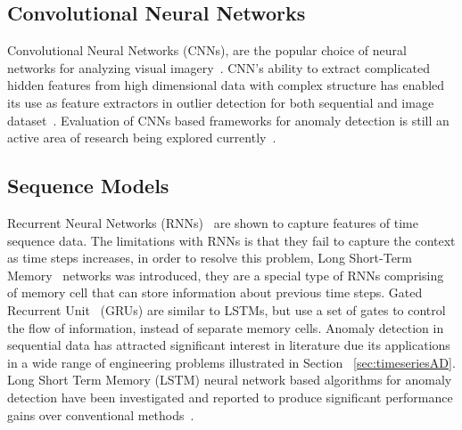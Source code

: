 \subsection{Convolutional Neural Networks }
\label{sec:cnn}
Convolutional Neural Networks (CNNs), are the popular choice of neural networks for analyzing visual imagery~\cite{krizhevsky2012imagenet}.  CNN’s ability to extract complicated hidden features from high dimensional data with complex structure has enabled its use as feature extractors in outlier detection for both sequential and image dataset~\cite{gorokhov2017convolutional,kim2014convolutional}. Evaluation of CNNs based frameworks for anomaly detection is still an active area of research being explored currently~\cite{kwon2018empirical}.

\subsection{Sequence Models}
\label{sec:rnn_lstm_gru}

Recurrent Neural Networks (RNNs)~\cite{williams1989complexity} are shown to capture features of time sequence data. The limitations with RNNs is that they fail to capture the context as time steps increases, in order to resolve this problem,  Long Short-Term Memory~\cite{hochreiter1997long} networks was introduced, they  are a special type of RNNs comprising of memory cell that can store information about previous time steps. Gated Recurrent Unit~\cite{cho2014learning} (GRUs) are similar to LSTMs, but use a set of gates to control the flow of information, instead of separate memory cells.
Anomaly detection in sequential data  has attracted significant interest in literature due its applications in a wide range of engineering problems illustrated in Section ~\ref{sec:timeseriesAD}.
Long Short Term Memory (LSTM) neural network based algorithms for anomaly detection  have been investigated and reported to produce significant performance gains over conventional methods~\cite{ergen2017unsupervised}.


